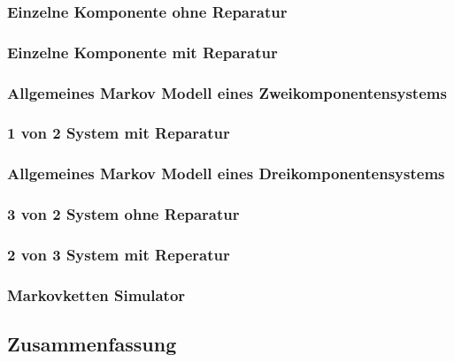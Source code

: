 \subsubsection{Einzelne Komponente ohne Reparatur}
\subsubsection{Einzelne Komponente mit Reparatur}
\subsubsection{Allgemeines Markov Modell eines Zweikomponentensystems}
\subsubsection*{1 von 2 System mit Reparatur}
\subsubsection{Allgemeines Markov Modell eines Dreikomponentensystems}
\subsubsection*{3 von 2 System ohne Reparatur}
\subsubsection*{2 von 3 System mit Reperatur}
\subsubsection{Markovketten Simulator}
\subsection{Zusammenfassung}












